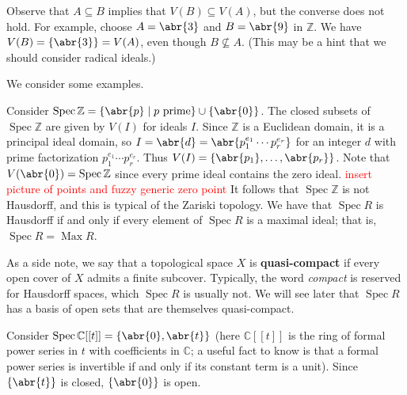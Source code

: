 \documentclass[11pt,leqno]{article}
\newcommand{\sai}[1]{\textcolor{red}{#1}}
\theoremstyle{plain}
\theoremstyle{definition}
\numberwithin{equation}{section}
\numberwithin{lem}{section}
\newcommand{\cbr}[1]{\left\{#1\right\}}
\newcommand{\bidx}[1]{\textbf{#1\index{#1}}} %
\DeclareMathOperator{\Max}{Max}
\DeclareMathOperator{\Spec}{Spec}
\begin{document}
Observe that $A\subseteq B$ implies that $V(B)\subseteq V(A)$, but the converse does not hold. For example, choose $A = \abr{3}$ and $B = \abr{9}$ in $\mathbb Z$. We have $V(B) = \cbr{\abr{3}} = V(A)$, even though $B\not\subseteq A$. (This may be a hint that we should consider radical ideals.)

We consider some examples.

Consider $\Spec \mathbb Z = \cbr{\abr{p}\mid p\text{ prime}}\cup\cbr{\abr{0}}$. The closed subsets of $\Spec \mathbb Z$ are given by $V(I)$ for ideals $I$. Since $\mathbb Z$ is a Euclidean domain, it is a principal ideal domain, so $I = \abr{d} = \abr{p_1^{e_1}\cdots p_r^{e_r}}$ for an integer $d$ with prime factorization $p_1^{e_1}\cdots p_r^{e_r}$. Thus $V(I) = \cbr{\abr{p_1},\dots,\abr{p_r}}$. Note that $V(\abr{0}) = \Spec \mathbb Z$ since every prime ideal contains the zero ideal. \sai{insert picture of points and fuzzy generic zero point}
It follows that $\Spec \mathbb Z$ is not Hausdorff, and this is typical of the Zariski topology. We have that $\Spec R$ is Hausdorff if and only if every element of $\Spec R$ is a maximal ideal; that is, $\Spec R = \Max R$.

As a side note, we say that a topological space $X$ is \bidx{quasi-compact} if every open cover of $X$ admits a finite subcover. Typically, the word \textit{compact} is reserved for Hausdorff spaces, which $\Spec R$ is usually not. We will see later that $\Spec R$ has a basis of open sets that are themselves quasi-compact.

Consider $\Spec \mathbb C[[t]] = \cbr{\abr{0},\abr{t}}$ (here $\mathbb C[[t]]$ is the ring of formal power series in $t$ with coefficients in $\mathbb C$; a useful fact to know is that a formal power series is invertible if and only if its constant term is a unit). Since $\cbr{\abr{t}}$ is closed, $\cbr{\abr{0}}$ is open.
\end{document}
